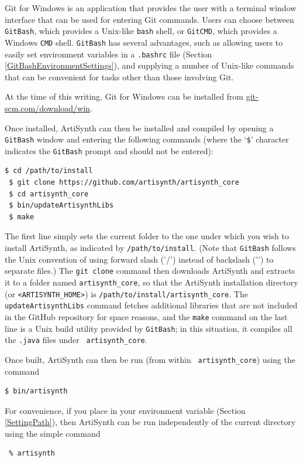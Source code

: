 Git for Windows is an application that provides the user with a
terminal window interface that can be used for entering Git commands.
Users can choose between {\tt GitBash}, which provides a Unix-like
{\tt bash} shell, or {\tt GitCMD}, which provides a Windows {\tt CMD}
shell. {\tt GitBash} has several advantages, such as allowing users
to easily set environment variables in a {\tt .bashrc} file
(Section \ref{GitBashEnvironmentSettings}), and supplying a number of
Unix-like commands that can be convenient for tasks other than those
involving Git.

At the time of this writing, Git for Windows can be installed from
\href{https://git-scm.com/download/win}{git-scm.com/download/win}.

Once installed, ArtiSynth can then be installed and compiled by
opening a {\tt GitBash} window and entering the following commands
(where the `{\tt \$}' character indicates the {\tt GitBash} prompt
and should not be entered):
%
\begin{lstlisting}[]
 $ cd /path/to/install
 $ git clone https://github.com/artisynth/artisynth_core
 $ cd artisynth_core
 $ bin/updateArtisynthLibs
 $ make
\end{lstlisting}
%
The first line simply sets the current folder to the one under which
you wish to install ArtiSynth, as indicated by {\tt /path/to/install}.
(Note that {\tt GitBash} follows the Unix convention of using forward
slash ('/') instead of backslash ('\BKS ') to separate files.)  The
{\tt git clone} command then downloads ArtiSynth and extracts it to a
folder named {\tt artisynth\_core}, so that the ArtiSynth installation
directory (or {\tt <ARTISYNTH\_HOME>}) is\pdfbreak 
{\tt /path/to/install/artisynth\_core}. The {\tt updateArtisynthLibs}
command fetches additional libraries that are not included in the
GitHub repository for space reasons, and the {\tt make} command on the
last line is a Unix build utility provided by {\tt GitBash}; in this
situation, it compiles all the {\tt .java} files under {\tt
artisynth\_core}.

Once built, ArtiSynth can then be run (from within {\tt
artisynth\_core}) using the command
%
\begin{lstlisting}[]
  $ bin/artisynth
\end{lstlisting}
%
\begin{sideblock}
For convenience, if you place  in your \PATH{}
environment variable (Section \ref{SettingPath}), 
then ArtiSynth can be run independently of the current
directory using the simple command
\begin{verbatim}
 % artisynth
\end{verbatim}
\end{sideblock}

